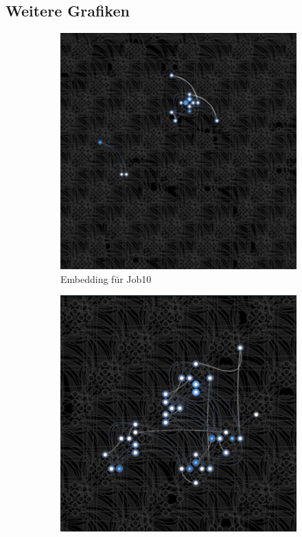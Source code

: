     \subsection*{Weitere Grafiken}
     \begin{figure}[H]
        \centering
        \begin{subfigure}[b]{0.4\textwidth}
            \centering
            \includegraphics[width=\textwidth]{images/Embedding10.png}
            \caption[]%
            {{\small Embedding für Job10}}    
            \label{fig:EmbeddingJob10}
        \end{subfigure}
        \hfill
        \begin{subfigure}[b]{0.4\textwidth}  
            \centering 
            \includegraphics[width=\textwidth]{images/Embedding20.png}

\end{subfigure}
\end{figure}
